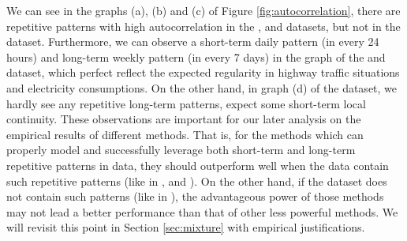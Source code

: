 We can see in the graphs (a), (b) and (c) of Figure \ref{fig:autocorrelation}, there are repetitive patterns with high autocorrelation in the \traffic, \solar and \electricity datasets, but not in the \exchange dataset. Furthermore, we can observe a short-term daily pattern (in every 24 hours) and long-term weekly pattern (in every 7 days) in the graph of the \traffic and \electricity dataset, which perfect reflect the expected regularity in highway traffic situations and electricity consumptions.  On the other hand, in graph (d) of the \exchange dataset, we hardly see any repetitive long-term patterns, expect some short-term local continuity. These observations are important for our later analysis on the empirical results of different methods.  That is, for the methods which can properly model and successfully leverage both short-term and long-term repetitive patterns in data, they should outperform well when the data contain such repetitive patterns (like in \electricity, \traffic and \solar).  On the other hand, if the dataset does not contain such patterns (like in \exchange), the advantageous power of those methods may not lead a better performance than that of other less powerful methods.  We will revisit this point in Section \ref{sec:mixture} with empirical justifications.

